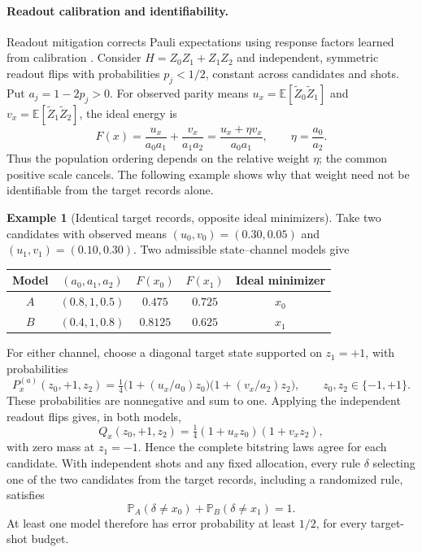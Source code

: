 \documentclass[a4paper,onecolumn,unpublished,nopdfoutputerror]{quantumarticle}
\theoremstyle{plain}
\theoremstyle{definition}
\newtheorem{example}[theorem]{Example}
\newcommand{\E}{\mathbb{E}}
\newcommand{\Prob}{\mathbb{P}}
\newcommand{\1}{\mathbf{1}}
\begin{document}
\paragraph{Readout calibration and identifiability.}
Readout mitigation corrects Pauli expectations using response factors learned from calibration \cite{Bravyi2021,vandenBerg2022}. Consider $H=Z_0Z_1+Z_1Z_2$ and independent, symmetric readout flips with probabilities $p_j<1/2$, constant across candidates and shots. Put $a_j=1-2p_j>0$. For observed parity means $u_x=\E[\widetilde Z_0\widetilde Z_1]$ and $v_x=\E[\widetilde Z_1\widetilde Z_2]$, the ideal energy is
\begin{equation}\label{eq:readout_relative_weights}
F(x)=\frac{u_x}{a_0a_1}+\frac{v_x}{a_1a_2}
=\frac{u_x+\eta v_x}{a_0a_1},\qquad \eta=\frac{a_0}{a_2}.
\end{equation}
Thus the population ordering depends on the relative weight $\eta$; the common positive scale cancels. The following example shows why that weight need not be identifiable from the target records alone.

\begin{example}[Identical target records, opposite ideal minimizers]
\label{ex:readout_identifiability}
Take two candidates with observed means $(u_0,v_0)=(0.30,0.05)$ and $(u_1,v_1)=(0.10,0.30)$. Two admissible state--channel models give
\begin{center}
\begin{tabular}{ccccc}
\toprule
Model & $(a_0,a_1,a_2)$ & $F(x_0)$ & $F(x_1)$ & Ideal minimizer\\
\midrule
$A$ & $(0.8,1,0.5)$ & $0.475$ & $0.725$ & $x_0$\\
$B$ & $(0.4,1,0.8)$ & $0.8125$ & $0.625$ & $x_1$\\
\bottomrule
\end{tabular}
\end{center}
For either channel, choose a diagonal target state supported on $z_1=+1$, with probabilities
\[
P_x^{(a)}(z_0,+1,z_2)=\tfrac14\bigl(1+(u_x/a_0)z_0\bigr)
\bigl(1+(v_x/a_2)z_2\bigr),\qquad z_0,z_2\in\{-1,+1\}.
\]
These probabilities are nonnegative and sum to one. Applying the independent readout flips gives, in both models,
\[
Q_x(z_0,+1,z_2)=\tfrac14(1+u_xz_0)(1+v_xz_2),
\]
with zero mass at $z_1=-1$. Hence the complete bitstring laws agree for each candidate. With independent shots and any fixed allocation, every rule $\delta$ selecting one of the two candidates from the target records, including a randomized rule, satisfies
\[
\Prob_A(\delta\ne x_0)+\Prob_B(\delta\ne x_1)=1.
\]
At least one model therefore has error probability at least $1/2$, for every target-shot budget.
\end{example}
\end{document}
